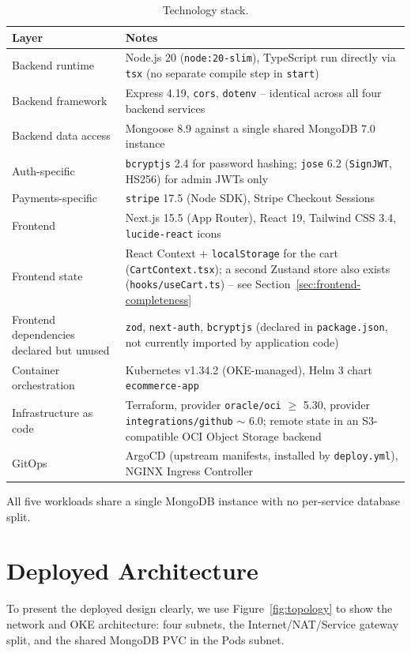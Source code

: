 \begin{table}[H]
\centering
\caption{Technology stack.}
\label{tab:tech-stack}
\small
\begin{tabularx}{\textwidth}{>{\raggedright\arraybackslash}p{3.2cm}
                >{\raggedright\arraybackslash}X}
\toprule
\textbf{Layer} & \textbf{Notes} \\
\midrule
Backend runtime & Node.js 20 (\texttt{node:20-slim}), TypeScript run directly via \texttt{tsx} (no separate compile step in \texttt{start}) \\
Backend framework & Express 4.19, \texttt{cors}, \texttt{dotenv} -- identical across all four backend services \\
Backend data access & Mongoose 8.9 against a single shared MongoDB 7.0 instance \\
Auth-specific & \texttt{bcryptjs} 2.4 for password hashing; \texttt{jose} 6.2 (\texttt{SignJWT}, HS256) for admin JWTs only \\
Payments-specific & \texttt{stripe} 17.5 (Node SDK), Stripe Checkout Sessions \\
Frontend & Next.js 15.5 (App Router), React 19, Tailwind CSS 3.4, \texttt{lucide-react} icons \\
Frontend state & React Context + \texttt{localStorage} for the cart (\texttt{CartContext.tsx}); a second Zustand store also exists (\texttt{hooks/useCart.ts}) -- see Section~\ref{sec:frontend-completeness} \\
Frontend dependencies declared but unused & \texttt{zod}, \texttt{next-auth}, \texttt{bcryptjs} (declared in \texttt{package.json}, not currently imported by application code) \\
Container orchestration & Kubernetes v1.34.2 (OKE-managed), Helm 3 chart \texttt{ecommerce-app} \\
Infrastructure as code & Terraform, provider \texttt{oracle/oci} $\geq$ 5.30, provider \texttt{integrations/github} $\sim$ 6.0; remote state in an S3-compatible OCI Object Storage backend \\
GitOps & ArgoCD (upstream manifests, installed by \texttt{deploy.yml}), NGINX Ingress Controller \\
\bottomrule
\end{tabularx}
\end{table}

All five workloads share a single MongoDB instance with no per-service database
split.

\newpage
\section{Deployed Architecture}\label{sec:deployed-architecture}
To present the deployed design clearly, we use Figure~\ref{fig:topology} to show
the network and OKE architecture: four
subnets, the Internet/NAT/Service gateway split, and the shared MongoDB PVC in the
Pods subnet.

